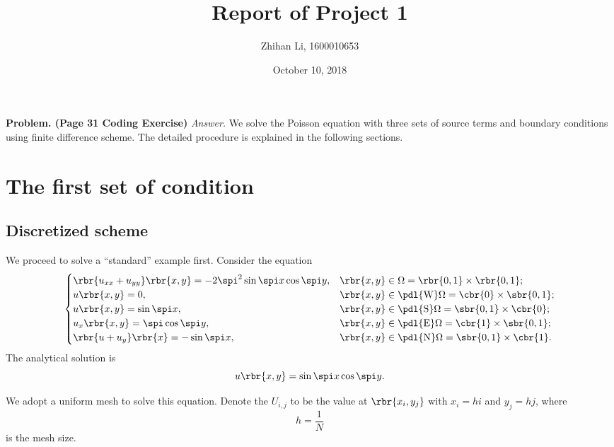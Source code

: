 \documentclass[english, nochinese]{pnote}
\title{Report of Project 1}
\author{Zhihan Li, 1600010653}
\date{October 10, 2018}
\begin{document}
\maketitle

\textbf{Problem. (Page 31 Coding Exercise)} \textit{Answer.} We solve the Poisson equation with three sets of source terms and boundary conditions using finite difference scheme. The detailed procedure is explained in the following sections.

\section{The first set of condition}

\subsection{Discretized scheme}

We proceed to solve a ``standard'' example first. Consider the equation
\begin{equation}
\begin{cases}
\rbr{ u_{ x x } + u_{ y y } } \rbr{ x, y } = -2 \spi^2 \sin \spi x \cos \spi y, & \rbr{ x, y } \in \Omega = \rbr{ 0, 1 } \times \rbr{ 0, 1 }; \\
u \rbr{ x, y } = 0, & \rbr{ x, y } \in \pdl{\text{W}} \Omega = \cbr{0} \times \sbr{ 0, 1 }; \\
u \rbr{ x, y } = \sin \spi x, & \rbr{ x, y } \in \pdl{\text{S}} \Omega = \sbr{ 0, 1 } \times \cbr{0}; \\
u_x \rbr{ x, y } = \spi \cos \spi y, & \rbr{ x, y } \in \pdl{\text{E}} \Omega = \cbr{1} \times \sbr{ 0, 1 }; \\
\rbr{ u + u_y } \rbr{x} = -\sin \spi x, & \rbr{ x, y } \in \pdl{\text{N}} \Omega = \sbr{ 0, 1 } \times \cbr{1}.
\end{cases}
\end{equation}
The analytical solution is
\begin{equation}
u \rbr{ x, y } = \sin \spi x \cos \spi y.
\end{equation}

We adopt a uniform mesh to solve this equation. Denote the $ U_{ i, j } $ to be the value at $ \rbr{ x_i, y_j } $ with $ x_i = h i $ and $ y_j = h j $, where
\begin{equation}
h = \frac{1}{N}
\end{equation}
is the mesh size.
\end{document}
